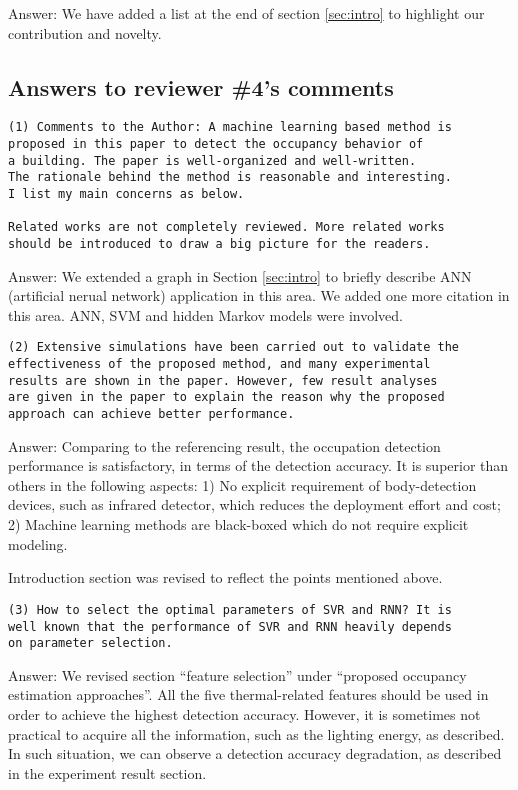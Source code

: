 Answer: We have added a list at the end of section \ref{sec:intro} to
highlight our contribution and novelty.

\subsection{Answers to reviewer \#4's comments}
\begin{verbatim}
(1) Comments to the Author: A machine learning based method is
proposed in this paper to detect the occupancy behavior of
a building. The paper is well-organized and well-written.
The rationale behind the method is reasonable and interesting.
I list my main concerns as below.

Related works are not completely reviewed. More related works
should be introduced to draw a big picture for the readers.
\end{verbatim}

Answer: We extended a graph in Section \ref{sec:intro} to briefly describe
ANN (artificial nerual network) application in this area. We added one more
citation in this area. ANN, SVM and hidden Markov models were involved.


\begin{verbatim}
(2) Extensive simulations have been carried out to validate the
effectiveness of the proposed method, and many experimental
results are shown in the paper. However, few result analyses
are given in the paper to explain the reason why the proposed
approach can achieve better performance.
\end{verbatim}

Answer: Comparing to the referencing result, the occupation detection performance is
satisfactory, in terms of the detection accuracy. It is superior than others
in the following aspects: 1) No explicit requirement of body-detection
devices, such as infrared detector, which reduces the deployment effort and
cost; 2) Machine learning methods are black-boxed which do not require
explicit modeling.

Introduction section was revised to reflect the points mentioned above.

\begin{verbatim}
(3) How to select the optimal parameters of SVR and RNN? It is
well known that the performance of SVR and RNN heavily depends
on parameter selection.
\end{verbatim}

Answer:
We revised section ``feature selection'' under ``proposed occupancy estimation
approaches''. All the five thermal-related features should be used in order to
achieve the highest detection accuracy. However, it is sometimes not practical
to acquire all the information, such as the lighting energy, as described.  In
such situation, we can observe a detection accuracy degradation, as described
in the experiment result section.



